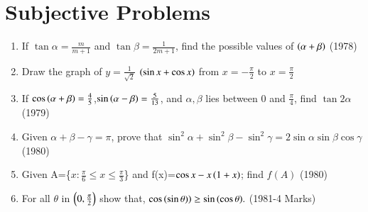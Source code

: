 \documentclass[journal,12pt,onecolumn]{IEEEtran}
\theoremstyle{remark}
\begin{document}
\section{Subjective Problems}
\begin{enumerate}
\item If $\tan{\alpha}=\frac{m}{m+1}$ and $\tan{\beta}=\frac{1}{2m+1}$, find the possible values of $\left(\alpha+\beta\right)$ \hfill(1978)
    \item Draw the graph of $y=\frac{1}{\sqrt{2}}$ $\left(\sin {x}+\cos {x}\right)$ from $x=-\frac{\pi}{2}$ to $x=\frac{\pi}{2}$
    \item If $\cos{\ensuremath{\left(\alpha+\beta\right)}}=\frac{4}{5}$,$\sin{\ensuremath{\left(\alpha-\beta\right)}}=\frac{5}{13}$, and $\alpha,\beta$ lies between 0 and $\frac{\pi}{4}$, find $\tan{2\alpha}$ \hfill(1979)
\item Given $\alpha+\beta-\gamma=\pi$, prove that $\sin^2{\alpha}+\sin^2{\beta}-\sin^2{\gamma}=2\sin{\alpha}\sin{\beta}\cos{\gamma}$ \hfill(1980)
\item Given A=\{$x:\frac{\pi}{6}\le x\le\frac{\pi}{3}$\} and f(x)=$\cos{x-x\ensuremath{\left(1+x\right)}}$; find $f(A)$ \hfill(1980)

\item For all $\theta$ in $\left(0, \frac{\pi}{2}\right)$ show that, $\cos{\ensuremath{\left(\sin{\theta)}\right)}}\geq 
\sin{\ensuremath{\left(\cos{\theta}\right)}}.$ \hfill(1981-4 Marks)
\end{enumerate}
\end{document}
